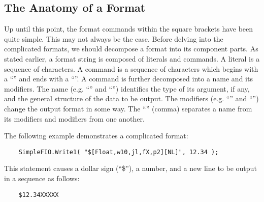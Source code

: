 \newpage


\subsection{The Anatomy of a Format}

Up until this point, the format commands within the square brackets
have been quite simple.  This may not always be the case.  Before
delving into the complicated formats, we should decompose a format
into its component parts.   As stated earlier, a format string is
composed of literals and
commands. 
A literal is a sequence of
characters.  A command is a sequence of characters which begins
with a ``\code{[}''\index{\code{[}}
and ends with a ``\code{]}''\index{\code{]}}.  A command is 
further decomposed into a 
name
and its modifiers.
The name (e.g. ``'' and ``'') identifies
the type of its argument, if any, and the general structure of the
data to be output.  The modifiers (e.g. ``'' and ``'')
change the output format in some way.  The
``\code{,}'' (comma) separates a name from its modifiers and modifiers
from one another.

The following example demonstrates a complicated format:
\begin{verbatim}
    SimpleFIO.Write1( "$[Float,w10,jl,fX,p2][NL]", 12.34 );
\end{verbatim}


This statement causes a dollar sign (``\$''), a  number, 
and a new line
to be output in a sequence as follows:
\begin{verbatim}
    $12.34XXXXX
\end{verbatim}

